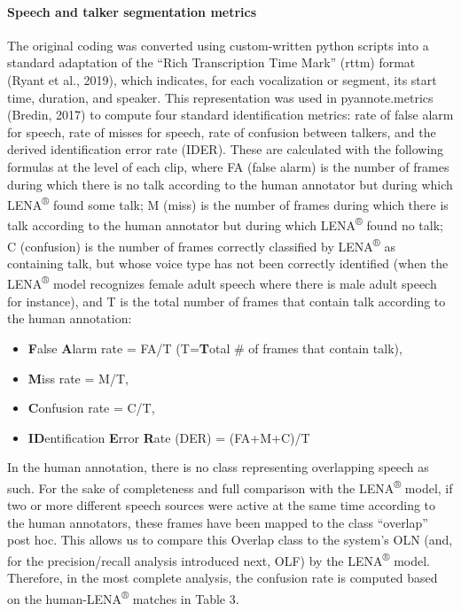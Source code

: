 \documentclass[english,table,man,floatsintext]{apa6}
\providecommand{\tightlist}{%
  \setlength{\itemsep}{0pt}\setlength{\parskip}{0pt}}
\let\oldparagraph\paragraph
\renewcommand{\paragraph}[1]{\oldparagraph{#1}\mbox{}}
\begin{document}
\hypertarget{speech-and-talker-segmentation-metrics}{%
\paragraph{Speech and talker segmentation metrics}\label{speech-and-talker-segmentation-metrics}}

The original coding was converted using custom-written python scripts into a standard adaptation of the \enquote{Rich Transcription Time Mark} (rttm) format (Ryant et al., 2019), which indicates, for each vocalization or segment, its start time, duration, and speaker. This representation was used in pyannote.metrics (Bredin, 2017) to compute four standard identification metrics: rate of false alarm for speech, rate of misses for speech, rate of confusion between talkers, and the derived identification error rate (IDER). These are calculated with the following formulas at the level of each clip, where FA (false alarm) is the number of frames during which there is no talk according to the human annotator but during which LENA\textsuperscript{®} found some talk; M (miss) is the number of frames during which there is talk according to the human annotator but during which LENA\textsuperscript{®} found no talk; C (confusion) is the number of frames correctly classified by LENA\textsuperscript{®} as containing talk, but whose voice type has not been correctly identified (when the LENA\textsuperscript{®} model recognizes female adult speech where there is male adult speech for instance), and T is the total number of frames that contain talk according to the human annotation:

\begin{itemize}
\tightlist
\item
  \textbf{F}alse \textbf{A}larm rate = FA/T (T=\textbf{T}otal \# of frames that contain talk),
\item
  \textbf{M}iss rate = M/T,
\item
  \textbf{C}onfusion rate = C/T,
\item
  \textbf{ID}entification \textbf{E}rror \textbf{R}ate (DER) = (FA+M+C)/T
\end{itemize}

In the human annotation, there is no class representing overlapping speech as such. For the sake of completeness and full comparison with the LENA\textsuperscript{®} model, if two or more different speech sources were active at the same time according to the human annotators, these frames have been mapped to the class \enquote{overlap} post hoc. This allows us to compare this Overlap class to the system's OLN (and, for the precision/recall analysis introduced next, OLF) by the LENA\textsuperscript{®} model. Therefore, in the most complete analysis, the confusion rate is computed based on the human-LENA\textsuperscript{®} matches in Table 3.
\end{document}
